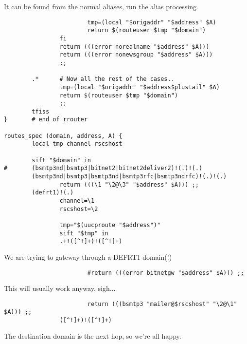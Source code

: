 It can be found from the normal aliases,
run the alias processing.

\begin{tscreen}
\begin{verbatim}
                        tmp=(local "$origaddr" "$address" $A)
                        return $(routeuser $tmp "$domain")
                fi
                return (((error norealname "$address" $A)))
                return (((error nonewsgroup "$address" $A)))
                ;;

        .*      # Now all the rest of the cases..
                tmp=(local "$origaddr" "$address$plustail" $A)
                return $(routeuser $tmp "$domain")
                ;;
        tfiss
}       # end of rrouter

routes_spec (domain, address, A) {
        local tmp channel rscshost

        sift "$domain" in
#       (bsmtp3nd|bsmtp3|bitnet2|bitnet2deliver2)!(.)!(.)
        (bsmtp3nd|bsmtp3|bsmtp3nd|bsmtp3rfc|bsmtp3ndrfc)!(.)!(.)
                return (((\1 "\2@\3" "$address" $A))) ;;
        (defrt1)!(.)
                channel=\1
                rscshost=\2

                tmp="$(uucproute "$address")"
                sift "$tmp" in
                .+!([^!]+)!([^!]+)
\end{verbatim}
\end{tscreen}


We are trying to gateway through a DEFRT1 domain(!)

\begin{tscreen}
\begin{verbatim}
                        #return (((error bitnetgw "$address" $A))) ;;
\end{verbatim}
\end{tscreen}


This will usually work anyway, sigh...

\begin{tscreen}
\begin{verbatim}
                        return (((bsmtp3 "mailer@$rscshost" "\2@\1" $A))) ;;
                ([^!]+)!([^!]+)
\end{verbatim}
\end{tscreen}


The destination domain is the next hop, so we're all happy.

